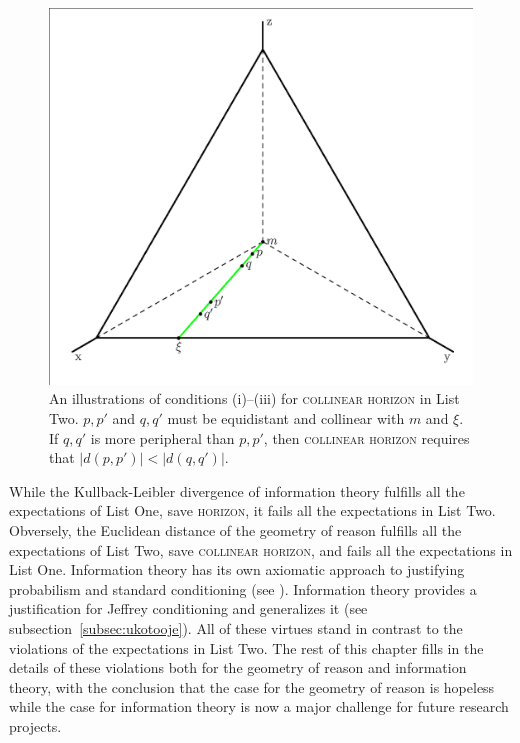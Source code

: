 \documentclass[phd,12pt,oneside]{ubcthesis}
\begin{document}
\begin{figure}[ht!]
    \begin{minipage}[h]{.7\linewidth}
      \includegraphics[width=\textwidth]{horeff.eps}
      \caption{\footnotesize An illustrations of conditions (i)--(iii)
        for \textsc{collinear horizon} in List Two. $p,p'$ and $q,q'$
        must be equidistant and collinear with $m$ and $\xi$. If
        $q,q'$ is more peripheral than $p,p'$, then \textsc{collinear
          horizon} requires that $|d(p,p')|<|d(q,q')|$.}
      \label{fig:conditions}
    \end{minipage}
\end{figure}

While the Kullback-Leibler divergence of information theory fulfills
all the expectations of List One, save \textsc{horizon}, it fails all
the expectations in List Two. Obversely, the Euclidean distance of the
geometry of reason fulfills all the expectations of List Two, save
\textsc{collinear horizon}, and fails all the expectations in List
One. Information theory has its own axiomatic approach to justifying
probabilism and standard conditioning (see
). Information theory provides a
justification for Jeffrey conditioning and generalizes it (see
subsection~\ref{subsec:ukotooje}). All of these virtues stand in
contrast to the violations of the expectations in List Two. The rest
of this chapter fills in the details of these violations both for the
geometry of reason and information theory, with the conclusion that
the case for the geometry of reason is hopeless while the case for
information theory is now a major challenge for future research
projects.
\end{document}
